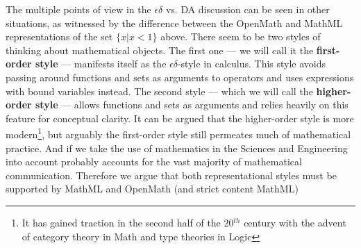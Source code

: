 \documentclass{llncs}
\begin{document}
  The multiple points of view in the $\epsilon\delta$ vs. DA discussion 
can be seen in other situations, 
  as witnessed by the difference between the OpenMath and MathML representations of
  the set $\{x | x < 1\}$ above. There seem to be two styles of thinking about
  mathematical objects. The first one --- we will call it the {\textbf{first-order style}}
  --- manifests itself as the $\epsilon\delta$-style in calculus. This style avoids
  passing around functions and sets as arguments to operators and uses expressions with
  bound variables instead. The second style --- which we will call the
  {\textbf{higher-order style}} --- allows functions and sets as arguments and relies
  heavily on this feature for conceptual clarity. It can be argued that the higher-order
  style is more modern\footnote{It has gained traction in the second half of the 20$^{th}$
    century with the advent of category theory in Math and type theories in Logic}, but
  arguably the first-order style still permeates much of mathematical practice. And if we
  take the use of mathematics in the Sciences and Engineering into account probably
  accounts for the vast majority of mathematical communication. Therefore we argue that
  both representational styles must be supported by MathML and OpenMath (and strict
  content MathML)
\end{document}

